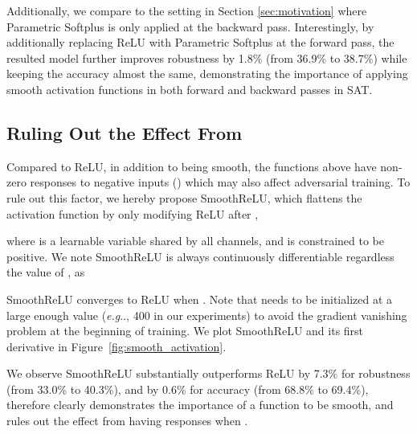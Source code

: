 \documentclass{article}
\makeatletter
\DeclareRobustCommand\onedot{\futurelet\@let@token\@onedot}
\def\@onedot{\ifx\@let@token.\else.\null\fi\xspace}
\def\eg{\emph{e.g}\onedot} \def\Eg{\emph{E.g}\onedot}
\makeatother
\begin{document}
Additionally, we compare to the setting in Section \ref{sec:motivation} where Parametric Softplus is only applied at the backward pass. Interestingly, by additionally replacing ReLU with Parametric Softplus at the forward pass, the resulted model further improves robustness by 1.8\% (from 36.9\% to 38.7\%) while keeping the accuracy almost the same, demonstrating the importance of applying smooth activation functions in both forward and backward passes in SAT.

\subsection{Ruling Out the Effect From }
Compared to ReLU, in addition to being smooth, the functions above have non-zero responses to negative inputs () which may also affect adversarial training. To rule out this factor, we hereby propose SmoothReLU, which flattens the activation function by only modifying ReLU after ,

where  is a learnable variable shared by all channels, and is constrained to be positive. We note SmoothReLU is always continuously differentiable regardless the value of , as

SmoothReLU converges to ReLU when . Note that  needs to be initialized at a large enough value (\eg, 400 in our experiments) to avoid the gradient vanishing problem at the beginning of training. We plot SmoothReLU and its first derivative in Figure~\ref{fig:smooth_activation}.

We observe SmoothReLU substantially outperforms ReLU by 7.3\% for robustness (from 33.0\% to 40.3\%), and by 0.6\% for accuracy (from 68.8\% to 69.4\%), therefore clearly demonstrates the importance of a function to be smooth, and rules out the effect from having responses when .
\end{document}
